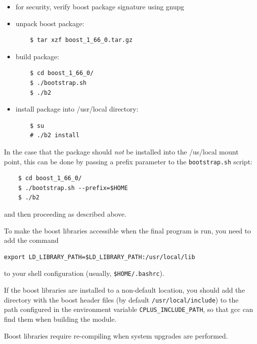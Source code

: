 \documentclass[11pt,a4paper]{report}
\begin{document}
\begin{itemize}
\item for security, verify boost package signature using gnupg

\item unpack boost package:
  
  \begin{verbatim}
    $ tar xzf boost_1_66_0.tar.gz
  \end{verbatim}    

\item build package:

  \begin{verbatim}
    $ cd boost_1_66_0/
    $ ./bootstrap.sh
    $ ./b2
  \end{verbatim}


\item install package into /usr/local directory:

  \begin{verbatim}
    $ su
    # ./b2 install
  \end{verbatim}    
\end{itemize}

In the case that the package  should \emph{not} be installed
into the /us/local mount point, this can be done by passing
a prefix parameter to the \texttt{bootstrap.sh} script:

  \begin{verbatim}
    $ cd boost_1_66_0/
    $ ./bootstrap.sh --prefix=$HOME
    $ ./b2
  \end{verbatim}

  and then proceeding as described above.


To make the boost libraries accessible when the
final program is run, you need to add the
command

\begin{verbatim}
export LD_LIBRARY_PATH=$LD_LIBRARY_PATH:/usr/local/lib
\end{verbatim}

to your shell configuration (usually, \verb+$HOME/.bashrc+).

If the boost libraries are installed to a non-default location, you
should add the directory with the boost header files (by default
\verb+/usr/local/include+) to the path configured in the environment
variable \verb+CPLUS_INCLUDE_PATH+, so that gcc can find them when
building the module.

Boost libraries require re-compiling when system upgrades are
performed.
\end{document}
